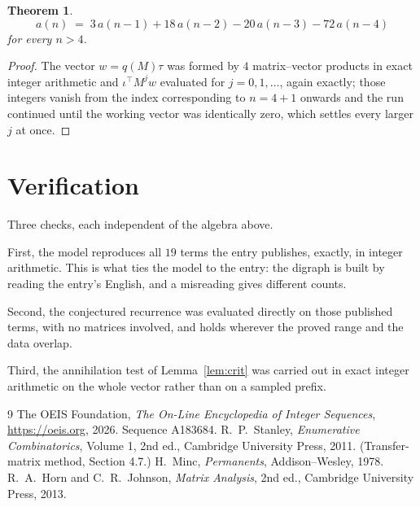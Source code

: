 \documentclass[11pt,a4paper]{article}
\theoremstyle{plain}
\newtheorem{theorem}{Theorem}
\theoremstyle{definition}
\begin{document}
\begin{theorem}
\[
a(n)\;=\;3\,a(n-1) + 18\,a(n-2) - 20\,a(n-3) - 72\,a(n-4)
\]
for every $n>4$.
\end{theorem}

\begin{proof}
The vector $w=q(M)\tau$ was formed by $4$ matrix--vector products in exact integer
arithmetic and $\iota^{\!\top}M^{j}w$ evaluated for $j=0,1,\dots$, again exactly; those
integers vanish from the index corresponding to $n=4+1$ onwards and the run continued
until the working vector was identically zero, which settles every larger $j$ at once.
\end{proof}

\section{Verification}

Three checks, each independent of the algebra above.

First, the model reproduces all $19$ terms the entry publishes, exactly, in integer
arithmetic. This is what ties the model to the entry: the digraph is built by reading the
entry's English, and a misreading gives different counts.

Second, the conjectured recurrence was evaluated directly on those published terms, with no
matrices involved, and holds wherever the proved range and the data overlap.

Third, the annihilation test of Lemma~\ref{lem:crit} was carried out in exact integer
arithmetic on the whole vector rather than on a sampled prefix.

\begin{thebibliography}{9}
 The OEIS Foundation, \emph{The On-Line Encyclopedia of Integer
Sequences}, \url{https://oeis.org}, 2026. Sequence A183684.
 R.~P.~Stanley, \emph{Enumerative Combinatorics}, Volume 1, 2nd ed.,
Cambridge University Press, 2011. (Transfer-matrix method, Section 4.7.)
 H.~Minc, \emph{Permanents}, Addison--Wesley, 1978.
 R.~A.~Horn and C.~R.~Johnson, \emph{Matrix Analysis}, 2nd ed., Cambridge
University Press, 2013.
\end{thebibliography}
\end{document}
